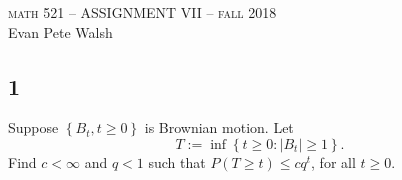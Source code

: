 \documentclass[12pt]{article}
\begin{document}
\thispagestyle{empty}
\begin{center}
  \Large \textsc{math 521 -- ASSIGNMENT VII -- fall 2018} \\ 
  \vspace{5mm}
  \large Evan Pete Walsh
\end{center}


\subsection*{1}
\begin{tcolorbox}
  Suppose $ \left\{ B_t, t \geq 0 \right\} $ is Brownian motion. Let
  \[
    T := \inf \left\{ t \geq 0 : |B_t| \geq 1 \right\}.
  \]
  Find $c  < \infty$ and $q < 1$ such that $P(T \geq t) \leq cq^t$, for all $t \geq 0$.
\end{tcolorbox}
\end{document}

